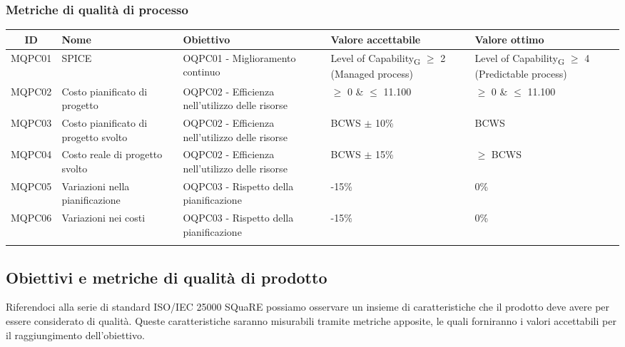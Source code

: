 \subsubsection{Metriche di qualità di processo}
\begin{center}
	\setlength\extrarowheight{5pt}
	\begin{tabularx}{\textwidth}{|c|X|X|X|X|}
		\hline
		\rowcolor{white}
		\textbf{ID} & \textbf{Nome} & \textbf{Obiettivo} & \textbf{Valore accettabile} & \textbf{Valore ottimo}\\
		\hline
		MQPC01 & SPICE & OQPC01 - Miglioramento continuo & Level of Capability\textsubscript{G} $\geq$ 2 (Managed process) & Level of Capability\textsubscript{G} $\geq$ 4 (Predictable process) \\
		\hline
		MQPC02 & Costo pianificato di progetto & OQPC02 - Efficienza nell'utilizzo delle risorse & $\geq$ 0 \& $\le$ 11.100 & $\geq$ 0 \& $\le$ 11.100\\
		\hline
		MQPC03 & Costo pianificato di progetto svolto & OQPC02 - Efficienza nell'utilizzo delle risorse & BCWS $ \pm $ 10\% & BCWS \\
		\hline
		MQPC04 & Costo reale di progetto svolto & OQPC02 - Efficienza nell'utilizzo delle risorse & BCWS $ \pm $ 15\% & $\geq$ BCWS \\
		\hline
		MQPC05 & Variazioni nella pianificazione & OQPC03 - Rispetto della pianificazione & -15\% & 0\% \\
		\hline
		MQPC06 & Variazioni nei costi & OQPC03 - Rispetto della pianificazione & -15\% & 0\% \\
		\hline
		\rowcolor{white}
		\caption{Metriche di qualità di processo.}
	\end{tabularx}
\end{center}
\newpage
\subsection{Obiettivi e metriche di qualità di prodotto}
Riferendoci alla serie di standard ISO/IEC 25000 SQuaRE possiamo osservare un insieme di caratteristiche che il prodotto deve avere per essere considerato di qualità. Queste caratteristiche saranno misurabili tramite metriche apposite, le quali forniranno i valori accettabili per il raggiungimento dell'obiettivo.
